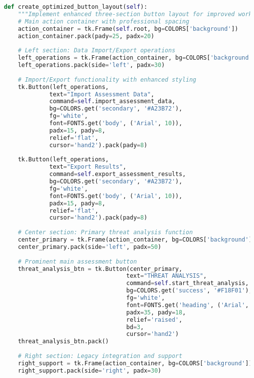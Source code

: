 \documentclass[binding=0.6cm]{sapthesis}
\begin{document}
\begin{lstlisting}[language=Python, caption=Phase 0/A Tool Enhanced Interface Layout]
def create_optimized_button_layout(self):
    """Implement enhanced three-section button layout for improved workflow"""
    # Main action container with professional spacing
    action_container = tk.Frame(self.root, bg=COLORS['background'])
    action_container.pack(pady=25, padx=20)
    
    # Left section: Data Import/Export operations
    left_operations = tk.Frame(action_container, bg=COLORS['background'])
    left_operations.pack(side='left', padx=30)
    
    # Import/Export functionality with enhanced styling
    tk.Button(left_operations, 
             text="Import Assessment Data",
             command=self.import_assessment_data,
             bg=COLORS.get('secondary', '#A23B72'),
             fg='white',
             font=FONTS.get('body', ('Arial', 10)),
             padx=15, pady=8,
             relief='flat',
             cursor='hand2').pack(pady=8)
    
    tk.Button(left_operations, 
             text="Export Results",
             command=self.export_assessment_results,
             bg=COLORS.get('secondary', '#A23B72'),
             fg='white',
             font=FONTS.get('body', ('Arial', 10)),
             padx=15, pady=8,
             relief='flat',
             cursor='hand2').pack(pady=8)
    
    # Center section: Primary threat analysis function
    center_primary = tk.Frame(action_container, bg=COLORS['background'])
    center_primary.pack(side='left', padx=50)
    
    # Prominent main assessment button
    threat_analysis_btn = tk.Button(center_primary,
                                   text="THREAT ANALYSIS",
                                   command=self.start_threat_analysis,
                                   bg=COLORS.get('success', '#F18F01'),
                                   fg='white',
                                   font=FONTS.get('heading', ('Arial', 12, 'bold')),
                                   padx=35, pady=18,
                                   relief='raised',
                                   bd=3,
                                   cursor='hand2')
    threat_analysis_btn.pack()
    
    # Right section: Legacy integration and support
    right_support = tk.Frame(action_container, bg=COLORS['background'])
    right_support.pack(side='right', padx=30)
    

\end{lstlisting}
\end{document}
